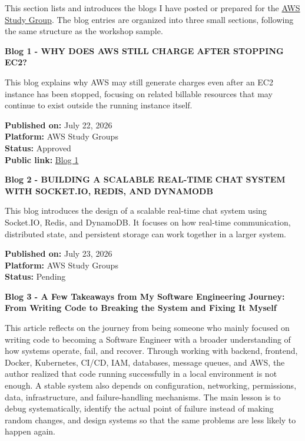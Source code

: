 This section lists and introduces the blogs I have posted or prepared
for the \href{https://www.facebook.com/groups/awsstudygroupfcj}{AWS
Study Group}. The blog entries are organized into three small sections,
following the same structure as the workshop sample.

\vspace{0.5em}\noindent\textbf{Blog 1 - WHY DOES AWS STILL CHARGE AFTER STOPPING
EC2?}\par

This blog explains why AWS may still generate charges even after an EC2
instance has been stopped, focusing on related billable resources that
may continue to exist outside the running instance itself.

\textbf{Published on:} July 22, 2026\\
\textbf{Platform:} AWS Study Groups\\
\textbf{Status:} Approved\\
\textbf{Public link:}
\href{https://www.facebook.com/groups/awsstudygroupfcj/permalink/2219932025438424/?rdid=SGRgenG5JS3UR6Y0\#}{Blog
1}

\vspace{0.5em}\noindent\textbf{Blog 2 - BUILDING A SCALABLE REAL-TIME CHAT SYSTEM WITH
SOCKET.IO, REDIS, AND
DYNAMODB}\par

This blog introduces the design of a scalable real-time chat system
using Socket.IO, Redis, and DynamoDB. It focuses on how real-time
communication, distributed state, and persistent storage can work
together in a larger system.

\textbf{Published on:} July 23, 2026\\
\textbf{Platform:} AWS Study Groups\\
\textbf{Status:} Pending

\vspace{0.5em}\noindent\textbf{Blog 3 - A Few Takeaways from My Software Engineering
Journey: From Writing Code to Breaking the System and Fixing It
Myself}\par

This article reflects on the journey from being someone who mainly
focused on writing code to becoming a Software Engineer with a broader
understanding of how systems operate, fail, and recover. Through working
with backend, frontend, Docker, Kubernetes, CI/CD, IAM, databases,
message queues, and AWS, the author realized that code running
successfully in a local environment is not enough. A stable system also
depends on configuration, networking, permissions, data, infrastructure,
and failure-handling mechanisms. The main lesson is to debug
systematically, identify the actual point of failure instead of making
random changes, and design systems so that the same problems are less
likely to happen again.

